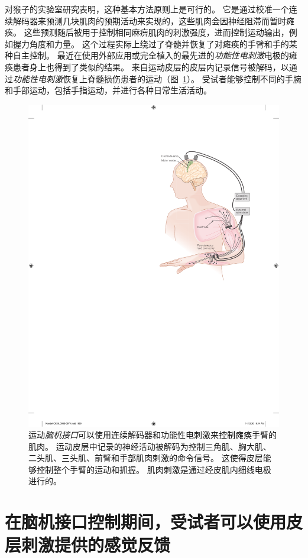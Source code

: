对猴子的实验室研究表明，这种基本方法原则上是可行的。
它是通过校准一个连续解码器来预测几块肌肉的预期活动来实现的，这些肌肉会因神经阻滞而暂时瘫痪。
这些预测随后被用于控制相同麻痹肌肉的刺激强度，进而控制运动输出，例如握力角度和力量。
这个过程实际上绕过了脊髓并恢复了对瘫痪的手臂和手的某种自主控制。
最近在使用外部应用或完全植入的最先进的\textit{功能性电刺激}电极的瘫痪患者身上也得到了类似的结果。
来自运动皮层的皮层内记录信号被解码，以通过\textit{功能性电刺激}恢复上脊髓损伤患者的运动（图~\ref{fig:39_11}）。
受试者能够控制不同的手腕和手部运动，包括手指运动，并进行各种日常生活活动。


\begin{figure}[htbp]
	\centering
	\includegraphics[width=0.75\linewidth]{chap39/fig_39_11}
	\caption{运动\textit{脑机接口}可以使用连续解码器和功能性电刺激来控制瘫痪手臂的肌肉。
		运动皮层中记录的神经活动被解码为控制三角肌、胸大肌、二头肌、三头肌、前臂和手部肌肉刺激的命令信号。
		这使得皮层能够控制整个手臂的运动和抓握。
		肌肉刺激是通过经皮肌内细线电极进行的\cite{ajiboye2017restoration}。}
	\label{fig:39_11}
\end{figure}



\section{在脑机接口控制期间，受试者可以使用皮层刺激提供的感觉反馈}

